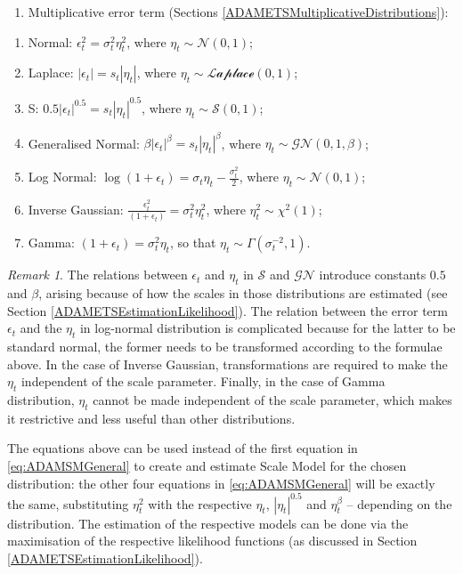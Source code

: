 \documentclass[]{book}
\providecommand{\tightlist}{%
  \setlength{\itemsep}{0pt}\setlength{\parskip}{0pt}}
\theoremstyle{definition}
\theoremstyle{definition}
\theoremstyle{definition}
\theoremstyle{definition}
\theoremstyle{remark}
\newtheorem*{remark}{Remark}
\begin{document}
\begin{enumerate}
\def\labelenumi{\arabic{enumi}.}
\setcounter{enumi}{1}
\tightlist
\item
  Multiplicative error term (Sections \ref{ADAMETSMultiplicativeDistributions}):
\end{enumerate}

\begin{enumerate}
\def\labelenumi{\alph{enumi}.}
\tightlist
\item
  Normal: \(\epsilon_t^2 = \sigma_t^2 \eta_t^2\), where \(\eta_t \sim \mathcal{N}(0, 1)\);
\item
  Laplace: \(|\epsilon_t| = s_t |\eta_t|\), where \(\eta_t \sim \mathcal{Laplace}(0, 1)\);
\item
  S: \(0.5 |\epsilon_t|^{0.5} = s_t |\eta_t|^{0.5}\), where \(\eta_t \sim \mathcal{S}(0, 1)\);
\item
  Generalised Normal: \(\beta |\epsilon_t|^{\beta} = s_t |\eta_t|^{\beta}\), where \(\eta_t \sim \mathcal{GN}(0, 1, \beta)\);
\item
  Log Normal: \(\log\left(1+\epsilon_t \right) = \sigma_t \eta_t -\frac{\sigma_t^2}{2}\), where \(\eta_t \sim \mathcal{N}(0, 1)\);
\item
  Inverse Gaussian: \(\frac{\epsilon_t ^2}{\left(1+\epsilon_t \right)}=\sigma^2_t \eta_t^2\), where \(\eta_t^2 \sim \chi^2(1)\);
\item
  Gamma: \(\left(1+\epsilon_t \right) = \sigma_t^2 \eta_t\), so that \(\eta_t \sim \mathcal{\Gamma}(\sigma_t^{-2}, 1)\).
\end{enumerate}

\begin{remark}
The relations between \(\epsilon_t\) and \(\eta_t\) in \(\mathcal{S}\) and \(\mathcal{GN}\) introduce constants \(0.5\) and \(\beta\), arising because of how the scales in those distributions are estimated (see Section \ref{ADAMETSEstimationLikelihood}). The relation between the error term \(\epsilon_t\) and the \(\eta_t\) in log-normal distribution is complicated because for the latter to be standard normal, the former needs to be transformed according to the formulae above. In the case of Inverse Gaussian, transformations are required to make the \(\eta_t\) independent of the scale parameter. Finally, in the case of Gamma distribution, \(\eta_t\) cannot be made independent of the scale parameter, which makes it restrictive and less useful than other distributions.
\end{remark}

The equations above can be used instead of the first equation in \eqref{eq:ADAMSMGeneral} to create and estimate Scale Model for the chosen distribution: the other four equations in \eqref{eq:ADAMSMGeneral} will be exactly the same, substituting \(\eta_t^2\) with the respective \(\eta_t\), \(|\eta_t|^{0.5}\) and \(\eta_t^{\beta}\) -- depending on the distribution. The estimation of the respective models can be done via the maximisation of the respective likelihood functions (as discussed in Section \ref{ADAMETSEstimationLikelihood}).
\end{document}
